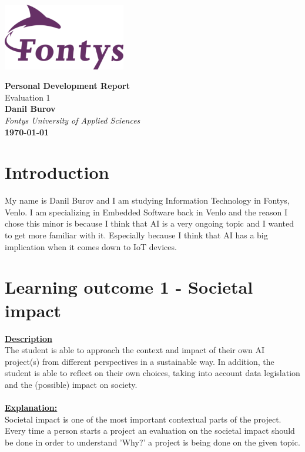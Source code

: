 \documentclass{article}
\begin{document}
\begin{titlepage}
    \centering
    \vspace*{3cm}
    
    \includegraphics[width=0.4\textwidth]{images/fontyslogo.png} %
    \vspace{1.5cm}
    
    {\Huge\bfseries Personal Development Report}\\[1cm]
    {\LARGE Evaluation 1}\\[2cm]
    
    \textbf{Danil Burov}\\
    \vspace{0.5cm}
    \textit{Fontys University of Applied Sciences}\\[3cm]
    \vfill
    \textbf{\today}

\end{titlepage}
\newpage
\tableofcontents
\newpage

\section{Introduction}
My name is Danil Burov and I am studying Information Technology in Fontys, Venlo. I am specializing in 
Embedded Software back in Venlo and the reason I chose this minor is because I think that AI is a very 
ongoing topic and I wanted to get more familiar with it. Especially because I think that AI has a big 
implication when it comes down to IoT devices.

\section{Learning outcome 1 - Societal impact}
\underline{\textbf{Description}}\\
The student is able to approach the context and impact of their own AI project(s) 
from different perspectives in a sustainable way. In addition, the student is able to 
reflect on their own choices, taking into account data legislation and the (possible) impact on society.\\\\
\underline{\textbf{Explanation:}}\\
Societal impact is one of the most important contextual parts of the project. Every time a person 
starts a project an evaluation on the societal impact should be done in order to understand 'Why?'
a project is being done on the given topic.
\end{document}
